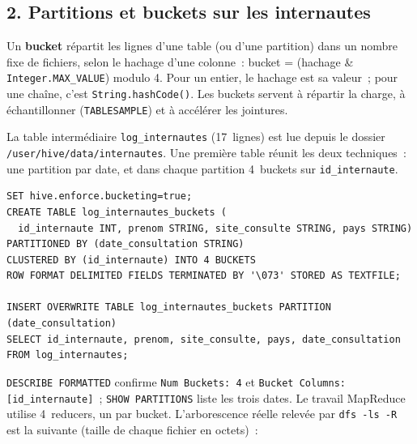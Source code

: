 \subsection*{2. Partitions et buckets sur les internautes}
{}

\noindent Un \textbf{bucket} répartit les lignes d'une table (ou d'une partition) dans un nombre fixe de fichiers, selon le hachage d'une colonne~: bucket = (hachage \& \texttt{Integer.MAX\_VALUE}) modulo 4. Pour un entier, le hachage est sa valeur~; pour une chaîne, c'est \texttt{String.hashCode()}. Les buckets servent à répartir la charge, à échantillonner (\texttt{TABLESAMPLE}) et à accélérer les jointures.

\noindent La table intermédiaire \texttt{log\_internautes} (17~lignes) est lue depuis le dossier \texttt{/user/hive/data/internautes}. Une première table réunit les deux techniques~: une partition par date, et dans chaque partition 4~buckets sur \texttt{id\_internaute}.

\begin{verbatim}
SET hive.enforce.bucketing=true;
CREATE TABLE log_internautes_buckets (
  id_internaute INT, prenom STRING, site_consulte STRING, pays STRING)
PARTITIONED BY (date_consultation STRING)
CLUSTERED BY (id_internaute) INTO 4 BUCKETS
ROW FORMAT DELIMITED FIELDS TERMINATED BY '\073' STORED AS TEXTFILE;

INSERT OVERWRITE TABLE log_internautes_buckets PARTITION (date_consultation)
SELECT id_internaute, prenom, site_consulte, pays, date_consultation FROM log_internautes;
\end{verbatim}

\noindent \texttt{DESCRIBE FORMATTED} confirme \texttt{Num Buckets: 4} et \texttt{Bucket Columns: [id\_internaute]}~; \texttt{SHOW PARTITIONS} liste les trois dates. Le travail MapReduce utilise 4~reducers, un par bucket. L'arborescence réelle relevée par \texttt{dfs -ls -R} est la suivante (taille de chaque fichier en octets)~:

